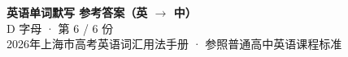 \documentclass[10pt,a4paper]{article}
\begin{document}
\pagestyle{plain}

\begin{center}
{\LARGE\bfseries 英语单词默写 \quad 参考答案（英 $\to$ 中）}\\[0.22em]
{\large D 字母 · 第 6 / 6 份}\\[0.18em]
{\small 2026年上海市高考英语词汇用法手册 · 参照普通高中英语课程标准}
\end{center}

\vspace{0.2em}
\noindent{\color{rulegray}\rule{\textwidth}{0.8pt}}

\vspace{0.35em}

\vspace{0.25em}
\renewcommand{\arraystretch}{1.32}
\end{document}
